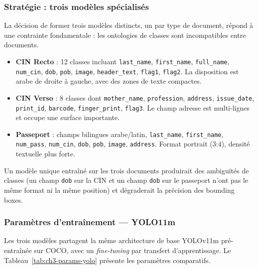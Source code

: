 \subsubsection{Stratégie : trois modèles spécialisés}

La décision de former trois modèles distincts, un par type de document, répond à une contrainte fondamentale : les ontologies de classes sont incompatibles entre documents.

\begin{itemize}
  \item \textbf{CIN Recto} : 12 classes incluant \texttt{last\_name}, \texttt{first\_name}, \texttt{full\_name}, \texttt{num\_cin}, \texttt{dob}, \texttt{pob}, \texttt{image}, \texttt{header\_text}, \texttt{flag1}, \texttt{flag2}. La disposition est arabe de droite à gauche, avec des zones de texte compactes.
  \item \textbf{CIN Verso} : 8 classes dont \texttt{mother\_name}, \texttt{profession}, \texttt{address}, \texttt{issue\_date}, \texttt{print\_id}, \texttt{barcode}, \texttt{finger\_print}, \texttt{flag3}. Le champ adresse est multi-lignes et occupe une surface importante.
  \item \textbf{Passeport} : champs bilingues arabe/latin, \texttt{last\_name}, \texttt{first\_name}, \texttt{num\_pass}, \texttt{num\_cin}, \texttt{dob}, \texttt{pob}, \texttt{image}, \texttt{address}. Format portrait ($3$:$4$), densité textuelle plus forte.
\end{itemize}

Un modèle unique entraîné sur les trois documents produirait des ambiguïtés de classes (un champ \texttt{dob} sur la CIN et un champ \texttt{dob} sur le passeport n'ont pas le même format ni la même position) et dégraderait la précision des bounding boxes.

\subsubsection{Paramètres d'entraînement --- YOLO11m}

Les trois modèles partagent la même architecture de base YOLOv11m pré-entraînée sur COCO, avec un \textit{fine-tuning} par transfert d'apprentissage. Le Tableau~\ref{tab:ch3-params-yolo} présente les paramètres comparatifs.


